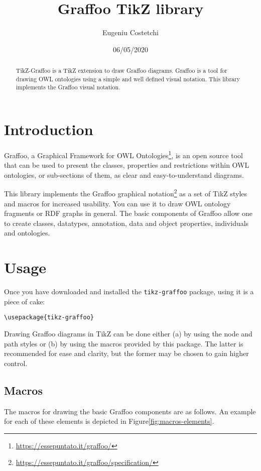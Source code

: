 \documentclass[11pt,a4paper,final,oneside,onecolumn]{article}
\author{Eugeniu Costetchi}
\title{Graffoo TikZ library}
\date{06/05/2020}
\begin{document}
	\maketitle
	
	\tableofcontents
	
	\begin{abstract}
		TikZ-Graffoo is a TikZ extension to draw Graffoo diagrams. Graffoo is a tool for drawing OWL ontologies using a simple and well defined visual notation. This library implements the Graffoo visual notation. 
	\end{abstract}
	
	\section{Introduction}
	
	Graffoo, a Graphical Framework for OWL Ontologies\footnote{\url{https://essepuntato.it/graffoo/}}, is an open source tool that can be used to present the classes, properties and restrictions within OWL ontologies, or sub-sections of them, as clear and easy-to-understand diagrams.
	
	This library implements the Graffoo graphical notation\footnote{\url{https://essepuntato.it/graffoo/specification/}} as a set of TikZ styles and macros for increased usability. You can use it to draw OWL ontology fragments or RDF graphs in general. The basic components of Graffoo allow one to create classes, datatypes, annotation, data and object properties, individuals and ontologies.
	
	\section{Usage}
	Once you have downloaded and installed the \texttt{tikz-graffoo} package, using it is a piece of cake:
	
	\verb|\usepackage{tikz-graffoo}|
	
	Drawing Graffoo diagrams in TikZ can be done either (a) by using the node and path styles or (b) by using the macros provided by this package. The latter is recommended for ease and clarity, but the former may be chosen to gain higher control. 
	
	
	\subsection{Macros}
	
	The macros for drawing the basic Graffoo components are as follows. An example for each of these elements is depicted in Figure\ref{fig:macros-elements}.
	
\end{document}
